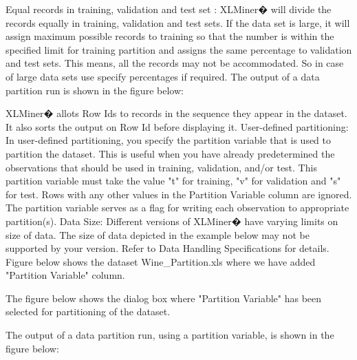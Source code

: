 Equal records in training, validation and test set : XLMiner�  will divide the records equally in training, validation and test sets. If the data set is large, it will assign maximum possible records to training so that the number is within the specified limit for training partition and assigns the same percentage to validation and test sets. This means, all the records may not be accommodated. So in case of large data sets use specify percentages if required.
 The output of a data partition run is shown in the figure below:

XLMiner� allots Row Ids to records in the sequence they appear in the dataset. It also sorts the output on Row Id before displaying it.
User-defined partitioning: In user-defined partitioning, you specify the partition variable that is used to partition the dataset. This is useful when you have already predetermined the observations that should be used in training, validation, and/or test. This partition variable must take the value "t" for training, "v" for validation and "s" for test. Rows with any other values in the Partition Variable column are ignored. The partition variable serves as a flag for writing each observation to appropriate partition(s).
Data Size: Different versions of XLMiner�  have varying limits on size of data. The size of data depicted in the example below may not be supported by your version. Refer to Data Handling Specifications for details.
Figure below shows the dataset Wine_Partition.xls where we have added "Partition Variable" column.

The figure below shows the dialog box where "Partition Variable" has been selected for partitioning of the dataset.
   
The output of a data partition run, using a partition variable, is shown in the figure below:

 

